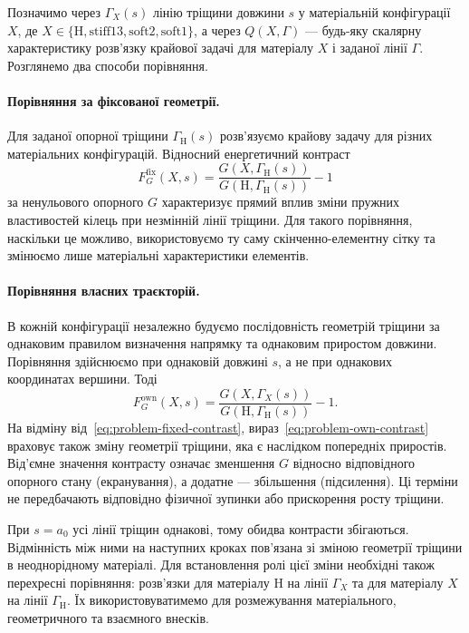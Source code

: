 Позначимо через $\Gamma_X(s)$ лінію тріщини довжини $s$ у матеріальній конфігурації $X$, де $X\in\{\mathrm H,\mathrm{stiff13},\mathrm{soft2},\mathrm{soft1}\}$, а через $Q(X,\Gamma)$ --- будь-яку скалярну характеристику розв'язку крайової задачі для матеріалу $X$ і заданої лінії $\Gamma$. Розглянемо два способи порівняння.

\paragraph{Порівняння за фіксованої геометрії.}
Для заданої опорної тріщини $\Gamma_{\mathrm H}(s)$ розв'язуємо крайову задачу для різних матеріальних конфігурацій. Відносний енергетичний контраст
\begin{equation}
 F_G^{\mathrm{fix}}(X,s)=
 \frac{G(X,\Gamma_{\mathrm H}(s))}
      {G(\mathrm H,\Gamma_{\mathrm H}(s))}-1
 \label{eq:problem-fixed-contrast}
\end{equation}
за ненульового опорного $G$ характеризує прямий вплив зміни пружних властивостей кілець при незмінній лінії тріщини. Для такого порівняння, наскільки це можливо, використовуємо ту саму скінченно-елементну сітку та змінюємо лише матеріальні характеристики елементів.

\paragraph{Порівняння власних траєкторій.}
В кожній конфігурації незалежно будуємо послідовність геометрій тріщини за однаковим правилом визначення напрямку та однаковим приростом довжини. Порівняння здійснюємо при однаковій довжині $s$, а не при однакових координатах вершини. Тоді
\begin{equation}
 F_G^{\mathrm{own}}(X,s)=
 \frac{G(X,\Gamma_X(s))}
      {G(\mathrm H,\Gamma_{\mathrm H}(s))}-1.
 \label{eq:problem-own-contrast}
\end{equation}
На відміну від~\eqref{eq:problem-fixed-contrast}, вираз~\eqref{eq:problem-own-contrast} враховує також зміну геометрії тріщини, яка є наслідком попередніх приростів. Від'ємне значення контрасту означає зменшення $G$ відносно відповідного опорного стану (екранування), а додатне --- збільшення (підсилення). Ці терміни не передбачають відповідно фізичної зупинки або прискорення росту тріщини.

При $s=a_0$ усі лінії тріщин однакові, тому обидва контрасти збігаються. Відмінність між ними на наступних кроках пов'язана зі зміною геометрії тріщини в неоднорідному матеріалі. Для встановлення ролі цієї зміни необхідні також перехресні порівняння: розв'язки для матеріалу H на лінії $\Gamma_X$ та для матеріалу $X$ на лінії $\Gamma_{\mathrm H}$. Їх використовуватимемо для розмежування матеріального, геометричного та взаємного внесків.

